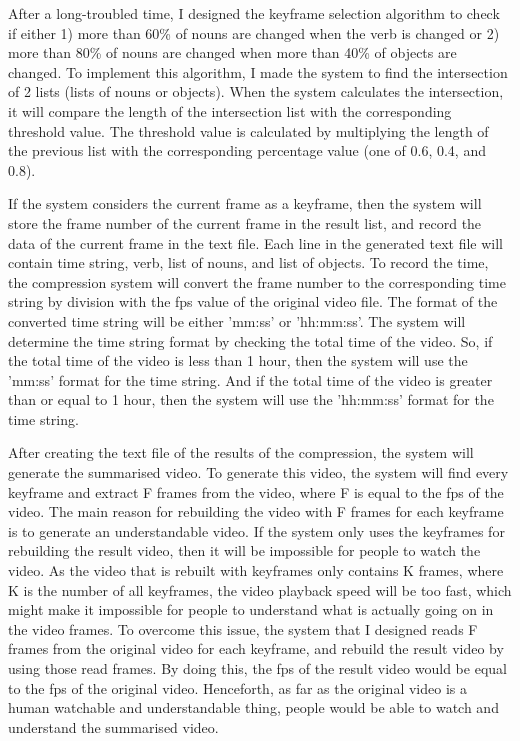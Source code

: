 \documentclass{article}
\begin{document}
After a long-troubled time, I designed the keyframe selection algorithm to check if either 1) more than 60\% of nouns are changed when the verb is changed or 2) more than 80\% of nouns are changed when more than 40\% of objects are changed. To implement this algorithm, I made the system to find the intersection of 2 lists (lists of nouns or objects). When the system calculates the intersection, it will compare the length of the intersection list with the corresponding threshold value. The threshold value is calculated by multiplying the length of the previous list with the corresponding percentage value (one of 0.6, 0.4, and 0.8).

If the system considers the current frame as a keyframe, then the system will store the frame number of the current frame in the result list, and record the data of the current frame in the text file. Each line in the generated text file will contain time string, verb, list of nouns, and list of objects. To record the time, the compression system will convert the frame number to the corresponding time string by division with the fps value of the original video file. The format of the converted time string will be either 'mm:ss' or 'hh:mm:ss'. The system will determine the time string format by checking the total time of the video. So, if the total time of the video is less than 1 hour, then the system will use the 'mm:ss' format for the time string. And if the total time of the video is greater than or equal to 1 hour, then the system will use the 'hh:mm:ss' format for the time string.

After creating the text file of the results of the compression, the system will generate the summarised video. To generate this video, the system will find every keyframe and extract F frames from the video, where F is equal to the fps of the video. The main reason for rebuilding the video with F frames for each keyframe is to generate an understandable video. If the system only uses the keyframes for rebuilding the result video, then it will be impossible for people to watch the video. As the video that is rebuilt with keyframes only contains K frames, where K is the number of all keyframes, the video playback speed will be too fast, which might make it impossible for people to understand what is actually going on in the video frames. To overcome this issue, the system that I designed reads F frames from the original video for each keyframe, and rebuild the result video by using those read frames. By doing this, the fps of the result video would be equal to the fps of the original video. Henceforth, as far as the original video is a human watchable and understandable thing, people would be able to watch and understand the summarised video.
\end{document}
